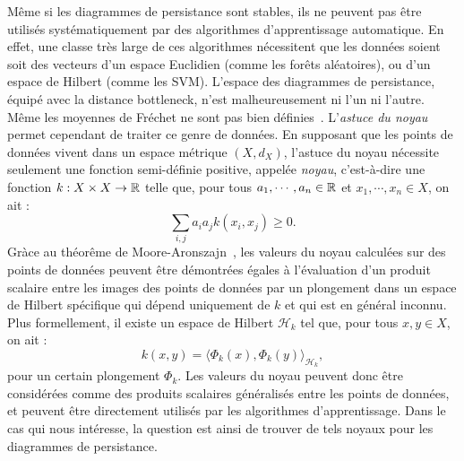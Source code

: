 M\^eme si les diagrammes de persistance sont stables, ils ne peuvent pas \^etre utilis\'es syst\'ematiquement par des algorithmes
d'apprentissage automatique. En effet, une classe tr\`es large de ces algorithmes n\'ecessitent que les donn\'ees soient soit des vecteurs
d'un espace Euclidien (comme les for\^ets al\'eatoires), ou d'un espace de Hilbert (comme les SVM).
L'espace des diagrammes de persistance, \'equip\'e avec la distance bottleneck, n'est malheureusement ni l'un ni l'autre.
M\^eme les moyennes de Fr\'echet ne sont pas bien d\'efinies~\cite{Turner14}. 
L'{\em astuce du noyau} permet cependant de traiter ce genre de donn\'ees.
En supposant que les points de donn\'ees vivent dans un espace m\'etrique $(X,d_X)$, l'astuce du noyau n\'ecessite seulement 
une fonction semi-d\'efinie positive, appel\'ee {\em noyau}, c'est-\`a-dire une fonction $k:X\times X\rightarrow\mathbb{R}$ telle que, pour tous 
$a_1,\cdots,a_n\in\mathbb{R}$ et  $x_1,\cdots,x_n\in X$, on ait :
$$\sum_{i,j}a_ia_jk(x_i,x_j)\geq 0.$$ 
Gr\`ace au th\'eor\^eme de Moore-Aronszajn~\cite{Aronszajn50}, les valeurs du  noyau calcul\'ees sur des points de donn\'ees peuvent \^etre d\'emontr\'ees
\'egales \`a l'\'evaluation d'un produit scalaire entre les images des points de donn\'ees par un plongement dans un espace de Hilbert sp\'ecifique
qui d\'epend uniquement de $k$ et qui est en g\'en\'eral inconnu.
Plus formellement, il existe un espace de Hilbert $\mathcal H_k$ tel que, pour tous $x,y\in X$, on ait : 
$$k(x,y)=\langle\Phi_k(x),\Phi_k(y)\rangle_{\mathcal H_k},$$
pour un certain plongement $\Phi_k$.
Les valeurs du noyau peuvent donc \^etre consid\'er\'ees comme des produits scalaires g\'en\'eralis\'es entre les points de donn\'ees, et peuvent \^etre
directement utilis\'es par les algorithmes d'apprentissage.
Dans le cas qui nous int\'eresse, la question est ainsi de trouver de tels noyaux pour les diagrammes de persistance.



